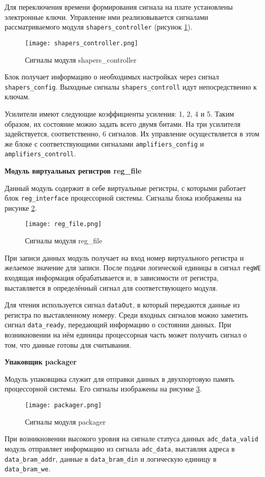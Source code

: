 Для переключения времени формирования сигнала на плате установлены электронные ключи. Управление ими реализовывается сигналами рассматриваемого модуля \texttt{shapers\_controller} (рисунок \ref{fig:shapers_controller}).\par
\begin{figure}[ht]
    \centering
    \texttt{[image: shapers\_controller.png]}
    \caption{Сигналы модуля shapers\_controller}
    \label{fig:shapers_controller}
\end{figure}
Блок получает информацию о необходимых настройках через сигнал \texttt{shapers\_config}. Выходные сигналы \texttt{shapers\_controll} идут непосредственно к ключам.\par
Усилители имеют следующие коэффициенты усиления: 1, 2, 4 и 5. Таким образом, их состояние можно задать всего двумя битами. На три усилителя задействуется, соответственно, 6 сигналов. Их управление осуществляется в этом же блоке с соответствующими сигналами \texttt{amplifiers\_config} и \texttt{amplifiers\_controll}.\par
\textbf{Модуль виртуальных регистров reg\_file}\par
Данный модуль содержит в себе виртуальные регистры, с которыми работает блок \texttt{reg\_interface} процессорной системы. Сигналы блока изображены на рисунке \ref{fig:reg_file}. \par
\begin{figure}[ht]
    \centering
    \texttt{[image: reg\_file.png]}
    \caption{Сигналы модуля reg\_file}
    \label{fig:reg_file}
\end{figure}
При записи данных модуль получает на вход номер виртуального регистра и желаемое значение для записи. После подачи логической единицы в сигнал \texttt{regWE} входящая информация обрабатывается и, в зависимости от регистра, выставляется в определённый сигнал для соответствующего модуля.\par
Для чтения используется сигнал \texttt{dataOut}, в который передаются данные из регистра по выставленному номеру. Среди входных сигналов можно заметить сигнал \texttt{data\_ready}, передающий информацию о состоянии данных. При возникновении на нём единицы процессорная часть может получить сигнал о том, что данные готовы для считывания.\par
\textbf{Упаковщик packager}\par
Модуль упаковщика служит для отправки данных в двухпортовую память процессорной системы. Его сигналы изображены на рисунке \ref{fig:packager}.\par 
\begin{figure}[ht]
    \centering
    \texttt{[image: packager.png]}
    \caption{Сигналы модуля packager}
    \label{fig:packager}
\end{figure}
При возникновении высокого уровня на сигнале статуса данных \texttt{adc\_data\_valid} модуль отправляет информацию из сигнала \texttt{adc\_data}, выставляя адреса в \texttt{data\_bram\_addr}, данные в \texttt{data\_bram\_din} и логическую единицу в \texttt{data\_bram\_we}.\par
